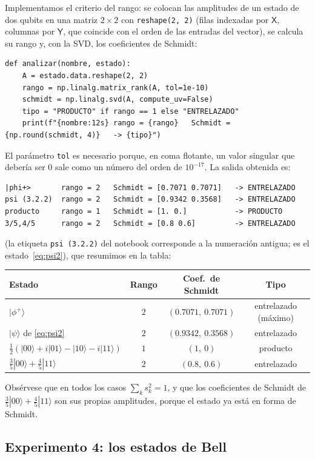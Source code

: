 \documentclass[11pt, a4paper, twoside, openright]{report}
\begin{document}
\noindent Implementamos el criterio del rango: se colocan las amplitudes de un estado de dos qubits en una matriz $2\times2$ con \texttt{reshape(2, 2)} (filas indexadas por $\mathsf{X}$, columnas por $\mathsf{Y}$, que coincide con el orden de las entradas del vector), se calcula su rango y, con la SVD, los coeficientes de Schmidt:
\begin{lstlisting}
def analizar(nombre, estado):
    A = estado.data.reshape(2, 2)
    rango = np.linalg.matrix_rank(A, tol=1e-10)
    schmidt = np.linalg.svd(A, compute_uv=False)
    tipo = "PRODUCTO" if rango == 1 else "ENTRELAZADO"
    print(f"{nombre:12s} rango = {rango}   Schmidt = {np.round(schmidt, 4)}   -> {tipo}")
\end{lstlisting}
\noindent El parámetro \texttt{tol} es necesario porque, en coma flotante, un valor singular que debería ser $0$ sale como un número del orden de $10^{-17}$. La salida obtenida es:
\begin{lstlisting}[language={}]
|phi+>       rango = 2   Schmidt = [0.7071 0.7071]   -> ENTRELAZADO
psi (3.2.2)  rango = 2   Schmidt = [0.9342 0.3568]   -> ENTRELAZADO
producto     rango = 1   Schmidt = [1. 0.]           -> PRODUCTO
3/5,4/5      rango = 2   Schmidt = [0.8 0.6]         -> ENTRELAZADO
\end{lstlisting}
\noindent (la etiqueta \texttt{psi (3.2.2)} del notebook corresponde a la numeración antigua; es el estado~\eqref{eq:psi2}), que resumimos en la tabla:
\begin{center}
\begin{tabular}{l|c|c|c}
\textbf{Estado} & \textbf{Rango} & \textbf{Coef.\ de Schmidt} & \textbf{Tipo} \\ \hline
$|\phi^+\rangle$ & $2$ & $(0.7071,\ 0.7071)$ & entrelazado (máximo) \\
$|\psi\rangle$ de \eqref{eq:psi2} & $2$ & $(0.9342,\ 0.3568)$ & entrelazado \\
$\frac12(|00\rangle + i|01\rangle - |10\rangle - i|11\rangle)$ & $1$ & $(1,\ 0)$ & producto \\
$\frac35|00\rangle + \frac45|11\rangle$ & $2$ & $(0.8,\ 0.6)$ & entrelazado
\end{tabular}
\end{center}
\noindent Obsérvese que en todos los casos $\sum_k s_k^2 = 1$, y que los coeficientes de Schmidt de $\frac35|00\rangle + \frac45|11\rangle$ son sus propias amplitudes, porque el estado ya está en forma de Schmidt.

\subsection{Experimento 4: los estados de Bell}
\end{document}
